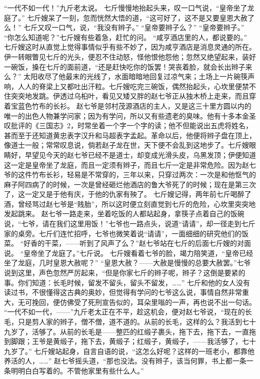 \documentclass[12pt,UTF8]{ctexbook}
\begin{document}
“一代不如一代！”九斤老太说。
七斤慢慢地抬起头来，叹一口气说，“皇帝坐了龙庭了。”
七斤嫂呆了一刻，忽而恍然大悟的道，“这可好了，这不是又要皇恩大赦了么！”
七斤又叹一口气，说，“我没有辫子。”
“皇帝要辫子么？”
“皇帝要辫子。”
“你怎么知道呢？”七斤嫂有些着急，赶忙的问。
“咸亨酒店里的人，都说要的。”
七斤嫂这时从直觉上觉得事情似乎有些不妙了，因为咸亨酒店是消息灵通的所在。伊一转眼瞥见七斤的光头，便忍不住动怒，怪他恨他怨他；忽然又绝望起来，装好一碗饭，搡在七斤的面前道，“还是赶快吃你的饭罢！哭丧着脸，就会长出辫子来么？”
太阳收尽了他最末的光线了，水面暗暗地回复过凉气来；土场上一片碗筷声响，人人的脊梁上又都吐出汗粒。七斤嫂吃完三碗饭，偶然抬起头，心坎里便禁不住突突地发跳。伊透过乌桕叶，看见又矮又胖的赵七爷正从独木桥上走来，而且穿着宝蓝色竹布的长衫。
赵七爷是邻村茂源酒店的主人，又是这三十里方圆以内的唯一的出色人物兼学问家；因为有学问，所以又有些遗老的臭味。他有十多本金圣叹批评的《三国志》2，时常坐着一个字一个字的读；他不但能说出五虎将姓名，甚而至于还知道黄忠表字汉升和马超表字孟起。革命以后，他便将辫子盘在顶上，像道士一般；常常叹息说，倘若赵子龙在世，天下便不会乱到这地步了。七斤嫂眼睛好，早望见今天的赵七爷已经不是道士，却变成光滑头皮，乌黑发顶；伊便知道这一定是皇帝坐了龙庭，而且一定须有辫子，而且七斤一定是非常危险。因为赵七爷的这件竹布长衫，轻易是不常穿的，三年以来，只穿过两次：一次是和他怄气的麻子阿四病了的时候，一次是曾经砸烂他酒店的鲁大爷死了的时候；现在是第三次了，这一定又是于他有庆，于他的仇家有殃了。
七斤嫂记得，两年前七斤喝醉了酒，曾经骂过赵七爷是“贱胎”，所以这时便立刻直觉到七斤的危险，心坎里突突地发起跳来。
赵七爷一路走来，坐着吃饭的人都站起身，拿筷子点着自己的饭碗说，“七爷，请在我们这里用饭！”七爷也一路点头，说道“请请”，却一径走到七斤家的桌旁。七斤们连忙招呼，七爷也微笑着说“请请”，一面细细的研究他们的饭菜。
“好香的干菜，——听到了风声了么？”赵七爷站在七斤的后面七斤嫂的对面说。
“皇帝坐了龙庭了。”七斤说。
七斤嫂看着七爷的脸，竭力陪笑道，“皇帝已经坐了龙庭，几时皇恩大赦呢？”
“皇恩大赦？——大赦是慢慢的总要大赦罢。”七爷说到这里，声色忽然严厉起来，“但是你家七斤的辫子呢，辫子？这倒是要紧的事。你们知道：长毛时候，留发不留头，留头不留发，……”
七斤和他的女人没有读过书，不很懂得这古典的奥妙，但觉得有学问的七爷这么说，事情自然非常重大，无可挽回，便仿佛受了死刑宣告似的，耳朵里嗡的一声，再也说不出一句话。
“一代不如一代，——”九斤老太正在不平，趁这机会，便对赵七爷说，“现在的长毛，只是剪人家的辫子，僧不僧，道不道的。从前的长毛，这样的么？我活到七十九岁了，活够了。从前的长毛是——整匹的红缎子裹头，拖下去，拖下去，一直拖到脚跟；王爷是黄缎子，拖下去，黄缎子；红缎子，黄缎子，——我活够了，七十九岁了。”
七斤嫂站起身，自言自语的说，“这怎么好呢？这样的一班老小，都靠他养活的人，……”
赵七爷摇头道，“那也没法。没有辫子，该当何罪，书上都一条一条明明白白写着的。不管他家里有些什么人。”
\end{document}
